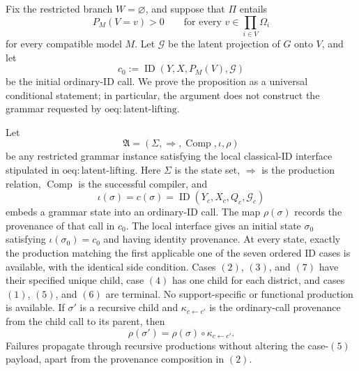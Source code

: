 Fix the restricted branch \(W=\varnothing\), and suppose that \(\Pi\) entails
\[
 P_M(V=v)>0
 \qquad\text{for every }v\in\prod_{i\in V}\Omega_i
 \tag{1}
\]
for every compatible model \(M\).  Let \(\mathcal G\) be the latent projection of \(G\) onto \(V\), and let
\[
 c_0:=\operatorname{ID}(Y,X,P_M(V),\mathcal G)
\]
be the initial ordinary-ID call.  We prove the proposition as a universal conditional statement; in particular, the argument does not construct the grammar requested by \(\mathrm{oeq:latent\text{-}lifting}\).

Let
\[
 \mathfrak A=(\Sigma,\Rightarrow,\operatorname{Comp},\iota,\rho)
\]
be any restricted grammar instance satisfying the local classical-ID interface stipulated in \(\mathrm{oeq:latent\text{-}lifting}\).  Here \(\Sigma\) is the state set, \(\Rightarrow\) is the production relation, \(\operatorname{Comp}\) is the successful compiler, and
\[
 \iota(\sigma)=c(\sigma)
   =\operatorname{ID}(Y_c,X_c,Q_c,\mathcal G_c)
\]
embeds a grammar state into an ordinary-ID call.  The map \(\rho(\sigma)\) records the provenance of that call in \(c_0\).  The local interface gives an initial state \(\sigma_0\) satisfying \(\iota(\sigma_0)=c_0\) and having identity provenance.  At every state, exactly the production matching the first applicable one of the seven ordered ID cases is available, with the identical side condition.  Cases \((2)\), \((3)\), and \((7)\) have their specified unique child, case \((4)\) has one child for each district, and cases \((1)\), \((5)\), and \((6)\) are terminal.  No support-specific or functional production is available.  If \(\sigma'\) is a recursive child and \(\kappa_{c\leftarrow c'}\) is the ordinary-call provenance from the child call to its parent, then
\[
 \rho(\sigma')=\rho(\sigma)\circ\kappa_{c\leftarrow c'}.
 \tag{2}
\]
Failures propagate through recursive productions without altering the case-\((5)\) payload, apart from the provenance composition in \((2)\).

